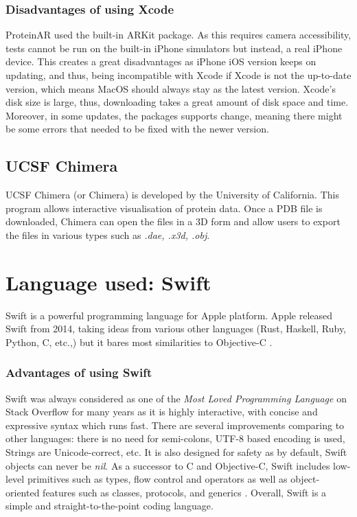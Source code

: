 		\subsubsection{Disadvantages of using Xcode}
ProteinAR used the built-in ARKit package. As this requires camera accessibility, tests cannot be run on the built-in iPhone simulators but instead, a real iPhone device. This creates a great disadvantages as iPhone iOS version keeps on updating, and thus, being incompatible with Xcode if Xcode is not the up-to-date version, which means MacOS should always stay as the latest version. Xcode’s disk size is large, thus, downloading takes a great amount of disk space and time. Moreover, in some updates, the packages supports change, meaning there might be some errors that needed to be fixed with the newer version. 

	\subsection{UCSF Chimera}
UCSF Chimera (or Chimera) is developed by the University of California. This program allows interactive visualisation of protein data. Once a PDB file is downloaded, Chimera can open the files in a 3D form and allow users to export the files in various types such as \emph{.dae, .x3d, .obj}.
	
	\section{Language used: Swift}
Swift is a powerful programming language for Apple platform. Apple released Swift from 2014, taking ideas from various other languages (Rust, Haskell, Ruby, Python, C, etc.,) but it bares most similarities to Objective-C  \parencite{noauthor_swift_nodate}. 
	\subsubsection{Advantages of using Swift}
Swift was always considered as one of the \emph{Most Loved Programming Language} on Stack Overflow for many years as it is highly interactive, with concise and expressive syntax which runs fast. There are several improvements comparing to other languages: there is no need for semi-colons, UTF-8 based encoding is used, Strings are Unicode-correct, etc. It is also designed for safety as by default, Swift objects can never be \emph{nil}. As a successor to C and Objective-C, Swift includes low-level primitives such as types, flow control and operators as well as object-oriented features such as classes, protocols, and generics \parencite{noauthor_swift_nodate}. Overall, Swift is a simple and straight-to-the-point coding language.

